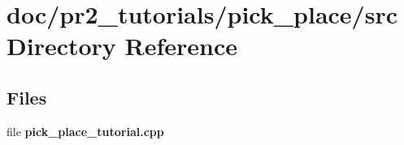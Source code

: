 \section{doc/pr2\-\_\-tutorials/pick\-\_\-place/src Directory Reference}
\label{dir_4f7204bfbf8ba7d2ede2936cd51124b6}
\subsection*{Files}
\begin{DoxyCompactItemize}
\item 
file {\bfseries pick\-\_\-place\-\_\-tutorial.\-cpp}
\end{DoxyCompactItemize}
